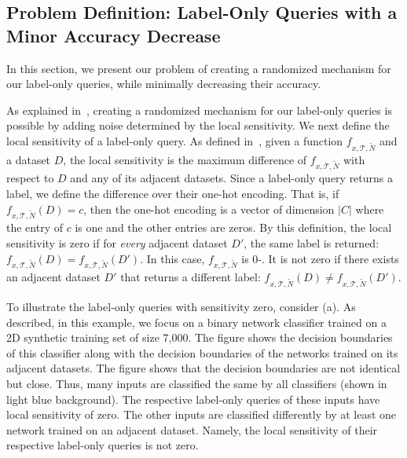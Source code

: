 \subsection{Problem Definition: \propi Label-Only Queries with a Minor Accuracy Decrease}
In this section, we present our problem of creating a randomized mechanism for our label-only queries, while minimally decreasing their accuracy. 

As explained in~, creating a randomized mechanism for our label-only queries is possible by adding noise determined by the local sensitivity. We next define the local sensitivity of a label-only query. 
As defined in~, given a function $f_{x,\mathcal{T},\widetilde{N}}$
and a dataset $D$,  
the local sensitivity is the maximum difference of $f_{x,\mathcal{T},\widetilde{N}}$ with respect to $D$ and any of its adjacent datasets. 
Since a label-only query returns a label, we define the difference over their one-hot encoding. That is, if $f_{x,\mathcal{T},\widetilde{N}}(D)=c$, then the one-hot encoding is a vector of dimension $|C|$ where the entry of $c$ is one and the other entries are zeros. By this definition, the local sensitivity is zero if for \emph{every} adjacent dataset $D'$, the same label is returned: $f_{x,\mathcal{T},\widetilde{N}}(D)=f_{x,\mathcal{T},\widetilde{N}}(D')$. 
In this case, $f_{x,\mathcal{T},\widetilde{N}}$ is 0-\propi.
It is not zero if there exists an adjacent dataset $D'$ that returns a different label: $f_{x,\mathcal{T},\widetilde{N}}(D)\neq f_{x,\mathcal{T},\widetilde{N}}(D')$.

To illustrate the label-only queries with sensitivity zero, consider (a).
As described, in this example, we focus on a binary network classifier trained on a 2D synthetic training set of size 7,000. 
The figure shows the decision boundaries of this classifier along with the decision boundaries of the networks trained on its adjacent datasets. The figure shows that the decision boundaries are not identical but close. Thus, many inputs are classified the same by all classifiers (shown in light blue background). The respective label-only queries of these inputs have local sensitivity of zero. The other inputs are classified differently by at least one network trained on an adjacent dataset. Namely, the local sensitivity of their respective label-only queries is not zero. 

